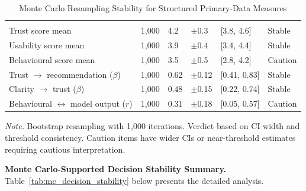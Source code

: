 {\tablestripes\tablefontsize
\begin{xltabular}{\textwidth}{@{} L l l l l l @{}}
\caption[Monte Carlo Resampling Stability for Structured]{Monte Carlo Resampling Stability for Structured Primary-Data Measures}\label{tab:mc_primary_results} \\
\toprule
{} &  &  &  &  &  \\
\midrule
\endfirsthead
\toprule
{} &  &  &  &  &  \\
\midrule
\endhead
\bottomrule
\endlastfoot
Trust score mean & 1,000 & 4.2 & $\pm$0.3 & [3.8, 4.6] & Stable \\
Usability score mean & 1,000 & 3.9 & $\pm$0.4 & [3.4, 4.4] & Stable \\
Behavioural score mean & 1,000 & 3.5 & $\pm$0.5 & [2.8, 4.2] & Caution \\
Trust $\rightarrow$ recommendation ($\beta$) & 1,000 & 0.62 & $\pm$0.12 & [0.41, 0.83] & Stable \\
Clarity $\rightarrow$ trust ($\beta$) & 1,000 & 0.48 & $\pm$0.15 & [0.22, 0.74] & Stable \\
Behavioural $\leftrightarrow$ model output ($r$) & 1,000 & 0.31 & $\pm$0.18 & [0.05, 0.57] & Caution \\
\end{xltabular}}
\vspace{2pt}
\noindent\textit{Note.} Bootstrap resampling with 1,000 iterations. Verdict based on CI width and threshold consistency. Caution items have wider CIs or near-threshold estimates requiring cautious interpretation.
\fi %

\iffalse %


\noindent\textbf{Monte Carlo-Supported Decision Stability Summary.} Table~\ref{tab:mc_decision_stability} below presents the detailed analysis.

